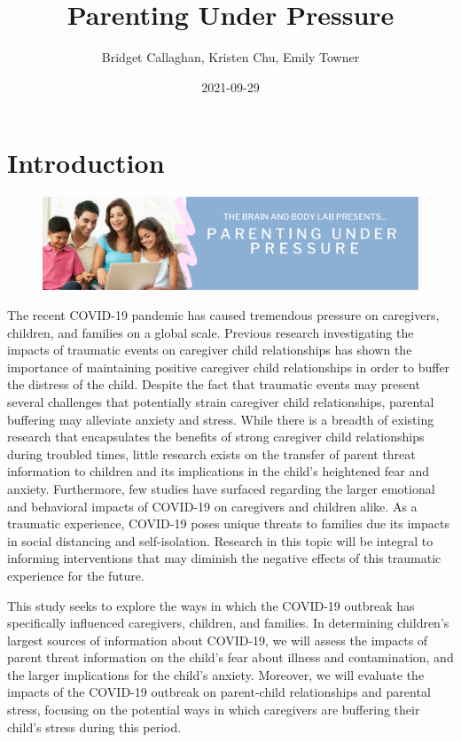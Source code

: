 \documentclass[]{book}
\title{Parenting Under Pressure}
\author{Bridget Callaghan, Kristen Chu, Emily Towner}
\date{2021-09-29}
\begin{document}
\maketitle

{
\setcounter{tocdepth}{1}
\tableofcontents
}
\hypertarget{introduction}{%
\chapter{Introduction}\label{introduction}}

\begin{figure}
\centering
\includegraphics{images/PUP_header.png}
\caption{}
\end{figure}

The recent COVID-19 pandemic has caused tremendous pressure on caregivers, children, and families on a global scale. Previous research investigating the impacts of traumatic events on caregiver child relationships has shown the importance of maintaining positive caregiver child relationships in order to buffer the distress of the child. Despite the fact that traumatic events may present several challenges that potentially strain caregiver child relationships, parental buffering may alleviate anxiety and stress. While there is a breadth of existing research that encapsulates the benefits of strong caregiver child relationships during troubled times, little research exists on the transfer of parent threat information to children and its implications in the child's heightened fear and anxiety. Furthermore, few studies have surfaced regarding the larger emotional and behavioral impacts of COVID-19 on caregivers and children alike. As a traumatic experience, COVID-19 poses unique threats to families due its impacts in social distancing and self-isolation. Research in this topic will be integral to informing interventions that may diminish the negative effects of this traumatic experience for the future.

This study seeks to explore the ways in which the COVID-19 outbreak has specifically influenced caregivers, children, and families. In determining children's largest sources of information about COVID-19, we will assess the impacts of parent threat information on the child's fear about illness and contamination, and the larger implications for the child's anxiety. Moreover, we will evaluate the impacts of the COVID-19 outbreak on parent-child relationships and parental stress, focusing on the potential ways in which caregivers are buffering their child's stress during this period.
\end{document}
